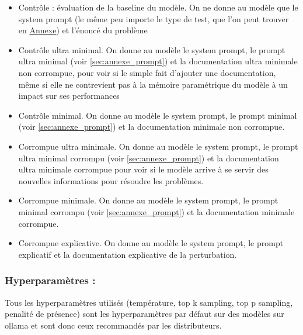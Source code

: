 \documentclass[11pt, a4paper]{article}
\begin{document}
\begin{itemize}[label=$\bullet$]
    \item Contrôle : évaluation de la baseline du modèle. On ne donne au modèle que le system prompt (le même peu importe le type de test, que l'on peut trouver en \hyperref[sec:annexe_prompt]{Annexe}) et l'énoncé du problème 
    \item Contrôle ultra minimal. On donne au modèle le system prompt, le prompt ultra minimal (voir \ref{sec:annexe_prompt}) et la documentation ultra minimale non corrompue, pour voir si le simple fait d'ajouter une documentation, même si elle ne contrevient pas à la mémoire paramétrique du modèle à un impact sur ses performances 
    \item Contrôle minimal. On donne au modèle le system prompt, le prompt minimal (voir \ref{sec:annexe_prompt}) et la documentation minimale non corrompue.
    \item Corrompue ultra minimale.  On donne au modèle le system prompt, le prompt ultra minimal corrompu (voir \ref{sec:annexe_prompt}) et la documentation ultra minimale corrompue pour voir si le modèle arrive à se servir des nouvelles informations pour résoudre les problèmes.
    \item Corrompue minimale.  On donne au modèle le system prompt, le prompt minimal corrompu (voir \ref{sec:annexe_prompt}) et la documentation minimale corrompue.
    \item Corrompue explicative. On donne au modèle le system prompt, le prompt explicatif et la documentation explicative de la perturbation.
\end{itemize}


\subsubsection{Hyperparamètres :} 
Tous les hyperparamètres utilisés (température, top k sampling, top p sampling, penalité de présence) sont les hyperparamètres par défaut sur des modèles sur ollama et sont donc ceux recommandés par les distributeurs. 
\end{document}
